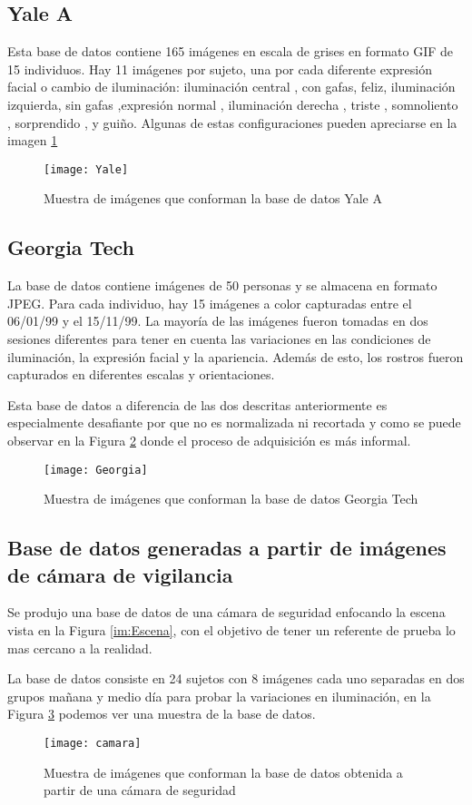 \subsection{Yale A}
Esta base de datos \cite{Yale} contiene 165 imágenes en escala de grises en formato GIF de 15 individuos. Hay 11 imágenes por sujeto, una por cada diferente expresión facial o cambio de iluminación: iluminación central , con gafas, feliz, iluminación izquierda, sin gafas ,expresión normal , iluminación derecha , triste , somnoliento , sorprendido , y guiño. Algunas de estas configuraciones pueden apreciarse en la imagen \ref{Yale}
\begin{figure}[h]
	\center
	\texttt{[image: Yale]}
    \caption{Muestra de imágenes que conforman la base de datos Yale A}
    \label{Yale}
\end{figure}
\subsection{Georgia Tech}
La base de datos \cite{Georgia} contiene imágenes de 50 personas y se almacena en formato JPEG. Para cada individuo, hay 15 imágenes a color capturadas entre el 06/01/99 y el 15/11/99. La mayoría de las imágenes fueron tomadas en dos sesiones diferentes para tener en cuenta las variaciones en las condiciones de iluminación, la expresión facial y la apariencia. Además de esto, los rostros fueron capturados en diferentes escalas y orientaciones.

Esta base de datos a diferencia de las dos descritas anteriormente es especialmente desafiante por que no es normalizada ni recortada y como se puede observar en la Figura \ref{Georgia} donde el proceso de adquisición es más informal.
\begin{figure}[h]
	\centering
	\texttt{[image: Georgia]}
    \caption{Muestra de imágenes que conforman la base de datos Georgia Tech}
    \label{Georgia}
\end{figure}
\subsection{Base de datos generadas a partir de imágenes de cámara de vigilancia}
\label{scc:BDCamara}
Se produjo una base de datos de una cámara de seguridad enfocando la escena vista en la Figura \ref{im:Escena}, con el objetivo de tener un referente de prueba lo mas cercano a la realidad.

La base de datos consiste en 24 sujetos con 8 imágenes cada uno separadas en dos grupos mañana y medio día para probar la variaciones en iluminación, en la Figura \ref{camara} podemos ver una muestra de la base de datos.
\begin{figure}[h]
	\centering
	\texttt{[image: camara]}
    \caption{Muestra de imágenes que conforman la base de datos obtenida a partir de una cámara de seguridad}
    \label{camara}
\end{figure}


